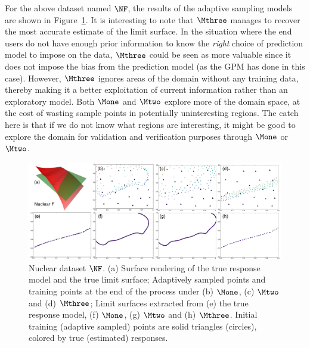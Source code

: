 For the above dataset named $\NF$, the results of the adaptive sampling models are shown in Figure~\ref{fig:nuclear-F}.
%
It is interesting to note that $\Mthree$ manages to recover the most accurate estimate of the limit surface.
%
In the situation where the end users do not have enough prior information to know the \emph{right} choice of prediction model to impose on the data, $\Mthree$ could be seen as more valuable since it does not impose the bias from the prediction model (as the GPM has done in this case).
%
However, $\Mthree$ ignores areas of the domain without any training data, thereby making it a better exploitation of current information rather than an exploratory model.
%
Both $\Mone$ and $\Mtwo$ explore more of the domain space, at the cost of wasting sample points in potentially uninteresting regions.
%
The catch here is that if we do not know what regions are interesting, it might be good to explore the domain for validation and verification purposes through $\Mone$ or $\Mtwo$.

\begin{figure}[!ht]
  \centering
  \includegraphics[width=1.0\textwidth]{figs/chap5/nuclear-F.pdf}
  \caption{Nuclear dataset $\protect\NF$.
  (a) Surface rendering of the true response model and the true limit surface; Adaptively sampled points and training points at the end of the process under (b) $\protect\Mone$, (c) $\protect\Mtwo$ and (d) $\protect\Mthree$;
  Limit surfaces extracted from (e) the true response model, (f) $\protect\Mone$, (g) $\protect\Mtwo$ and (h) $\protect\Mthree$.
  Initial training (adaptive sampled) points are solid triangles (circles), colored by true (estimated) responses.}
  \label{fig:nuclear-F}
\end{figure}


